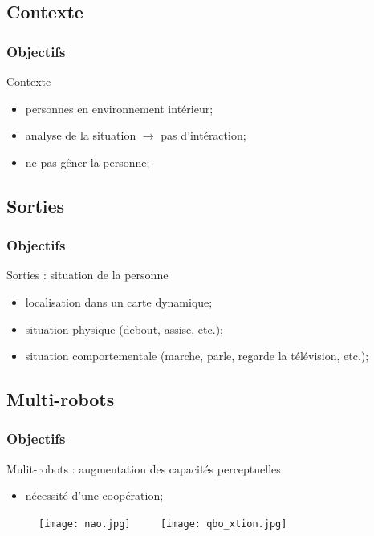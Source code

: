 \documentclass[usepdftitle=false, xcolor=dvipsnames, 12, c]{beamer}
\begin{document}
\subsection{Contexte}
\begin{frame}[label=objContexte]
\frametitle{Objectifs}
Contexte
\begin{itemize}
    \item[] personnes en environnement intérieur;
    \item[] analyse de la situation $\rightarrow$ pas d'intéraction;
    \item[] ne pas gêner la personne;
\end{itemize}
\end{frame}

\subsection{Sorties}
\begin{frame}[label=objSorties]
\frametitle{Objectifs}
Sorties : situation de la personne
    \begin{itemize}
        \item[] localisation dans un carte dynamique;
        \item[] situation physique (debout, assise, etc.);
        \item[] situation comportementale (marche, parle, regarde la télévision, etc.);
    \end{itemize}
\end{frame}

\subsection{Multi-robots}
\begin{frame}[label=objMultirobots]
\frametitle{Objectifs}
    Mulit-robots : augmentation des capacités perceptuelles
    \begin{itemize}
        \item[] nécessité d'une coopération;
    \end{itemize}
    \begin{figure}[p]
        \texttt{[image: nao.jpg]} ~~~~ \texttt{[image: qbo\_xtion.jpg]}
    \end{figure}
\end{frame}

\end{document}
